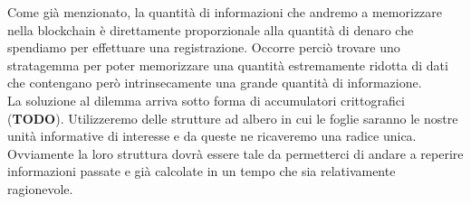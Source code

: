 Come già menzionato, la quantità di informazioni che andremo a memorizzare
nella blockchain è direttamente proporzionale alla quantità di denaro che
spendiamo per effettuare una registrazione.
Occorre perciò trovare uno stratagemma per poter memorizzare una quantità
estremamente ridotta di dati che contengano però intrinsecamente una grande
quantità di informazione. \\
La soluzione al dilemma arriva sotto forma di accumulatori crittografici (\textbf{TODO}).
Utilizzeremo delle strutture ad albero in cui le foglie saranno le nostre unità
informative di interesse e da queste ne ricaveremo una radice unica.
Ovviamente la loro struttura dovrà essere tale da permetterci di andare a reperire
informazioni passate e già calcolate in un tempo che sia relativamente ragionevole.

\newpage